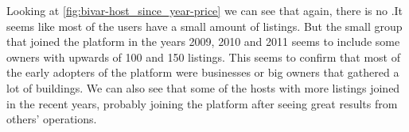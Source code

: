 
Looking at \cref{fig:bivar-host_since_year-price} we can see that again, there is no .It seems like most of the users have a small amount of listings. 
But the small group that joined the platform in the years 2009, 2010 and 2011 seems to include some owners with upwards of 100 and 150 listings. This seems to confirm that most of the early adopters of the platform were businesses or big owners that gathered a lot of buildings. We can also see that some of the hosts with more listings joined in the recent years, probably joining the platform after seeing great results from others' operations. 


\pagebreak

\label{sub:bivariate_analysis}


